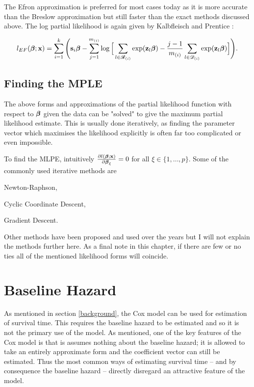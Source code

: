 The Efron approximation is preferred for most cases today as it is more accurate than the Breslow approximation but still faster than the exact methods discussed above. The log partial likelihood is again given by Kalbfleisch and Prentice :

\begin{equation}
    l_{EF}(\boldsymbol{\beta};\textbf{x})=\sum_{i=1}^k\Bigg(\textbf{s}_i\boldsymbol{\beta} - \sum_{j=1}^{m_{(i)}}\log\Big[\sum_{l\in\mathscr{R}_{(i)}}\exp(\textbf{z}_l\boldsymbol{\beta})-\frac{j-1}{m_{(i)}}\sum_{l\in\mathscr{D}_{(i)}}\exp(\textbf{z}_l\boldsymbol{\beta})\Big]\Bigg).
\end{equation}

\subsection{Finding the MPLE}

The above forms and approximations of the partial likelihood function with respect to $\boldsymbol{\beta}$ given the data can be "solved" to give the maximum partial likelihood estimate. This is usually done iteratively, as finding the parameter vector which maximises the likelihood explicitly is often far too complicated or even impossible. 

To find the MLPE, intuitively $\pdv{l(\boldsymbol{\beta};\textbf{x})}{\boldsymbol{\beta}_\xi}=0$ for all $\xi\in\{1,\ldots,p\}$. Some of the commonly used iterative methods are

\begin{itemize}
\begin{spacing}{0}
    \item Newton-Raphson,
    \item Cyclic Coordinate Descent,
    \item Gradient Descent.
\end{spacing}
\end{itemize}

Other methods have been proposed and used over the years but I will not explain the methods further here. 
As a final note in this chapter, if there are few or no ties all of the mentioned likelihood forms will coincide.

\section{Baseline Hazard}\label{baseline}

As mentioned in section \ref{background}, the Cox model can be used for estimation of survival time. This requires the baseline hazard to be estimated and so it is not the primary use of the model. As mentioned, one of the key features of the Cox model is that is assumes nothing about the baseline hazard; it is allowed to take an entirely approximate form and the coefficient vector can still be estimated. Thus the most common ways of estimating survival time -- and by consequence the baseline hazard -- directly disregard an attractive feature of the model.

